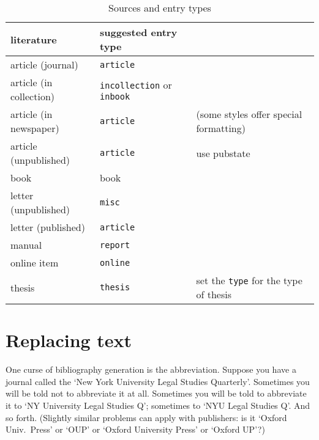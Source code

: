 {\begin{table*}
\begin{tabularx}{\linewidth}{llX}
\toprule
\textsf{literature}     & \textsf{suggested entry type} &                                              \\
\midrule
article (journal)       & \texttt{article}                                                             \\
article (in collection) & \texttt{incollection} or \texttt{inbook}                                     \\
article (in newspaper)  & \texttt{article}              & (some styles offer special formatting)       \\
article (unpublished)   & \texttt{article}              & use pubstate                                 \\
book                    & book                                                                         \\
letter (unpublished)    & \texttt{misc}                                                                \\
letter (published)      & \texttt{article}                                                             \\
manual                  & \texttt{report}                                                              \\
online item             & \texttt{online}                                                              \\
thesis                  & \texttt{thesis}               & set the \texttt{type} for the type of thesis \\
\bottomrule
\end{tabularx}
\caption{Sources and entry types\label{entry:summary}}
\end{table*}

\section{Replacing text}

One curse of bibliography generation is the abbreviation. Suppose you
have a journal called the `New York University Legal Studies
Quarterly'. Sometimes you will be told not to abbreviate it at
all. Sometimes you will be told to abbreviate it to `NY University
Legal Studies Q'; sometimes to `NYU Legal Studies Q'. And so
forth. (Slightly similar problems can apply with publishers: is it
`Oxford Univ.\ Press' or `OUP' or `Oxford University Press' or `Oxford
UP'?)

}

